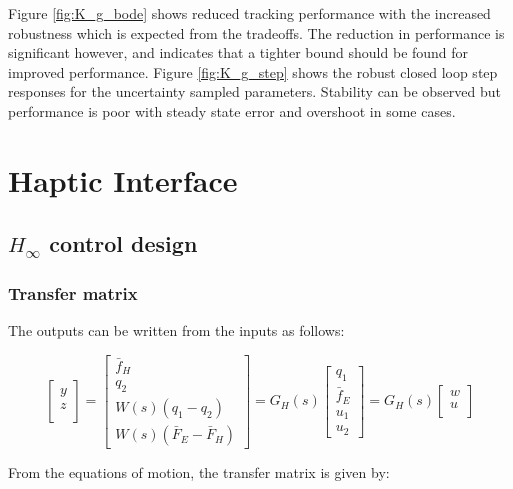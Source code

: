 \documentclass{article}
\begin{document}
Figure \ref{fig:K_g_bode} shows reduced tracking performance with the increased robustness which is expected from the tradeoffs.
The reduction in performance is significant however, and indicates that a tighter bound should be found for improved performance.
Figure \ref{fig:K_g_step} shows the robust closed loop step responses for the uncertainty sampled parameters.
Stability can be observed but performance is poor with steady state error and overshoot in some cases.
\section{Haptic Interface}

\subsection{ $H_\infty$ control design}

\subsubsection{Transfer matrix}

The outputs can be written from the inputs as follows:

\begin{equation}
    \begin{bmatrix}
        y \\
        z \\
    \end{bmatrix} = \begin{bmatrix}
        \bar{f}_H \\
        q_2 \\
        W(s)(q_1 - q_2) \\
        W(s)(\bar{F}_E - \bar{F}_H)
    \end{bmatrix} = G_H(s) \begin{bmatrix}
        q_1 \\
        \bar{f}_E \\
        u_1 \\
        u_2
    \end{bmatrix} = G_H(s) \begin{bmatrix}
        w \\
        u \\
    \end{bmatrix}
\end{equation}

From the equations of motion, the transfer matrix is given by:
\end{document}
